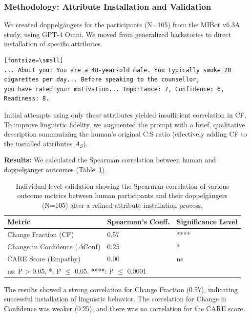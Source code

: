\subsubsection{Methodology: Attribute Installation and Validation}

We created doppelgängers for the participants (N=105) from the MIBot v6.3A study, using GPT-4 Omni. We moved from generalized backstories to direct installation of specific attributes.

\begin{verbatim}[fontsize=\small]
... About you: You are a 48-year-old male. You typically smoke 20
cigarettes per day... Before speaking to the counsellor,
you have rated your motivation... Importance: 7, Confidence: 6, Readiness: 8.
\end{verbatim}

Initial attempts using only these attributes yielded insufficient correlation in CF. To improve linguistic fidelity, we augmented the prompt with a brief, qualitative description summarizing the human's original C:S ratio (effectively adding CF to the installed attributes $A_S$).

\textbf{Results:} We calculated the Spearman correlation between human and doppelgänger outcomes (Table~\ref{tab:doppelganger-correlations}).

\begin{table}[h!]
\centering
\caption[Individual-level Validation of Doppelgänger Installation]{Individual-level validation showing the Spearman correlation of various outcome metrics between human participants and their doppelgängers (N=105) after a refined attribute installation process.}
\label{tab:doppelganger-correlations}
\begin{tabular}{@{}lll@{}}
\toprule
\textbf{Metric} & \textbf{Spearman's Coeff.} & \textbf{Significance Level} \\ \midrule
Change Fraction (CF) & 0.57 & **** \\
Change in Confidence ($\Delta$Conf) & 0.25 & * \\
CARE Score (Empathy) & 0.00 & ns \\ \bottomrule
\multicolumn{3}{l}{\footnotesize{ns: P > 0.05, *: P $\le$ 0.05, ****: P $\le$ 0.0001}}
\end{tabular}
\end{table}

The results showed a strong correlation for Change Fraction (0.57), indicating successful installation of linguistic behavior. The correlation for Change in Confidence was weaker (0.25), and there was no correlation for the CARE score.

